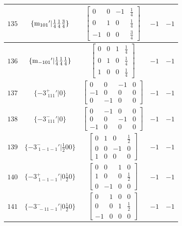 \documentclass[fleqn,8pt]{jsarticle}
\begin{document}
\begin{longtable}{ccccc}
$ 135 $ & $ \{{\rm m}_{101}{}'|\frac{1}{4} \frac{1}{4} \frac{3}{4}\} $ & $ \begin{bmatrix} 0 & 0 & -1 & \frac{1}{4} \\ 0 & 1 & 0 & \frac{1}{4} \\ -1 & 0 & 0 & \frac{3}{4} \end{bmatrix} $ & $ -1 $ & $ -1 $ \\ \hline
$ 136 $ & $ \{{\rm m}_{-101}{}'|\frac{1}{4} \frac{1}{4} \frac{1}{4}\} $ & $ \begin{bmatrix} 0 & 0 & 1 & \frac{1}{4} \\ 0 & 1 & 0 & \frac{1}{4} \\ 1 & 0 & 0 & \frac{1}{4} \end{bmatrix} $ & $ -1 $ & $ -1 $ \\ \hline
$ 137 $ & $ \{-3^{+}_{\,\,111}{}'|0\} $ & $ \begin{bmatrix} 0 & 0 & -1 & 0 \\ -1 & 0 & 0 & 0 \\ 0 & -1 & 0 & 0 \end{bmatrix} $ & $ -1 $ & $ -1 $ \\ \hline
$ 138 $ & $ \{-3^{-}_{\,\,111}{}'|0\} $ & $ \begin{bmatrix} 0 & -1 & 0 & 0 \\ 0 & 0 & -1 & 0 \\ -1 & 0 & 0 & 0 \end{bmatrix} $ & $ -1 $ & $ -1 $ \\ \hline
$ 139 $ & $ \{-3^{-}_{\,\,1-1-1}{}'|\frac{1}{2} 0 0\} $ & $ \begin{bmatrix} 0 & 1 & 0 & \frac{1}{2} \\ 0 & 0 & -1 & 0 \\ 1 & 0 & 0 & 0 \end{bmatrix} $ & $ -1 $ & $ -1 $ \\ \hline
$ 140 $ & $ \{-3^{+}_{\,\,1-1-1}{}'|0 \frac{1}{2} 0\} $ & $ \begin{bmatrix} 0 & 0 & 1 & 0 \\ 1 & 0 & 0 & \frac{1}{2} \\ 0 & -1 & 0 & 0 \end{bmatrix} $ & $ -1 $ & $ -1 $ \\ \hline
$ 141 $ & $ \{-3^{-}_{\,\,-11-1}{}'|0 \frac{1}{2} 0\} $ & $ \begin{bmatrix} 0 & 1 & 0 & 0 \\ 0 & 0 & 1 & \frac{1}{2} \\ -1 & 0 & 0 & 0 \end{bmatrix} $ & $ -1 $ & $ -1 $ \\ \hline

\end{longtable}
\end{document}

